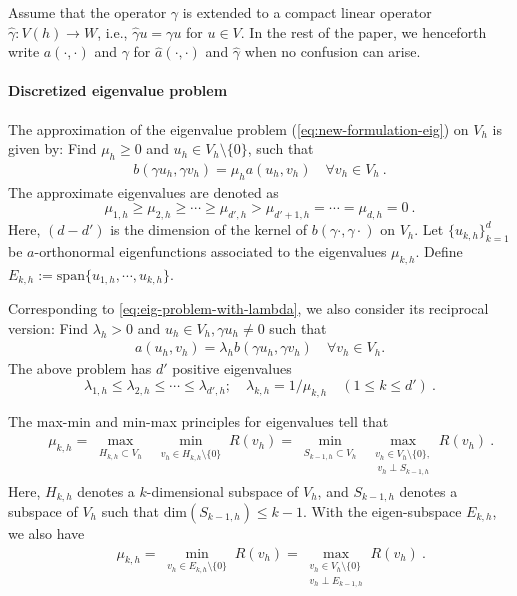 \documentclass[a4,11pt]{article}
\numberwithin{equation}{section}
\begin{document}
Assume that the operator $\gamma$ is extended to a compact linear operator $\widehat{\gamma}:V(h)\to W$, i.e., $\widehat{\gamma} u = \gamma u$  for $u \in V$.
%
In the rest of the paper, 
we henceforth write $a(\cdot, \cdot)$ and $\gamma$ for $\widehat a(\cdot, \cdot)$ and $\widehat\gamma$ when no confusion can arise.
 
 \medskip
 
 
 \paragraph{Discretized eigenvalue problem}
The approximation of the eigenvalue problem (\ref{eq:new-formulation-eig}) on $V_h$ is given by: Find $\mu_{h} \ge 0$ and $u_{h} \in V_{h}\setminus \{0\}$, such that
\begin{eqnarray}
\label{eq:eig-problem-n-m-h}
b(\gamma u_{h}, \gamma v_{h}) = \mu_h a(u_{h}, v_{h})\quad\forall v_{h}\in V_{h}~.
\end{eqnarray}
%
The approximate eigenvalues are denoted as
$$
\mu_{1,h} \ge \mu_{2,h} \ge \cdots \ge \mu_{{d'},h} > \mu_{{d'}+1,h} = \cdots  = 
\mu_{d,h}=0~.
$$
Here, $(d-{d'})$ is the dimension of the kernel of ${b(\gamma \cdot,\gamma \cdot)}$ on $V_h$. 
%
Let $\{u_{k,h}\}_{k=1}^{d}$ be $a$-orthonormal eigenfunctions
associated to the eigenvalues $\mu_{k,h}$.
Define $E_{k,h}:=\mbox{span}\{u_{1,h}, \cdots, u_{k,h}\}$.
 
Corresponding to \cref{eq:eig-problem-with-lambda}, we also consider its reciprocal  version: 
Find $\lambda_{h} > 0 $ and $u_{h} \in V_{h}, \gamma u_h \neq 0$ such that
\begin{eqnarray}
\label{eq:eig-problem-m-n-h}
a(u_{h},v_{h}) = \lambda_h b(\gamma u_{h}, \gamma v_{h})\quad\forall v_{h}\in V_{h}.
\end{eqnarray}
The above problem has ${d'}$ positive eigenvalues 
\begin{equation}
	\label{eq:def-lambda_k_h}
\lambda_{1,h} \le \lambda_{2,h}\le \cdots \le \lambda_{{d'},h}; \quad \lambda_{k,h}=1/\mu_{k,h}\quad (1\le k \le {d'})\:.
\end{equation}


\medskip


\medskip

The max-min and min-max principles for eigenvalues tell that
\begin{eqnarray}
&&    \mu_{k,h}=\max_{\substack{H_{k,h}\subset V_h}} ~\min_{\substack{v_h\in H_{k,h}\setminus \{0\}}}{R}(v_h) 
=\min_{\substack{S_{k-1,h}\subset V_h}} ~\max_{\substack{v_h\in V_h\setminus \{0\}, \\ ~v_h\perp S_{k-1,h}}} {R}(v_h)\:.
\label{eq:min-max-eig-subspace-fem}
\end{eqnarray}
 Here, $H_{k,h}$ denotes a $k$-dimensional subspace of  $V_h$,  and 
  $S_{k-1,h}$ denotes a subspace of  $V_h$ such that $\mbox{dim}(S_{k-1,h}) \le k-1$.  With the eigen-subspace  $E_{k,h}$, we also have
\begin{eqnarray}
&&\mu_{k,h}=\min_{\substack{v_h\in E_{k,h}\setminus \{0\}}} R(v_h) = 
\max_{\substack{v_h\in V_h\setminus\{0\}\\ v_h\perp E_{k-1,h}}} R(v_h) \:.
\label{eq:min-max-eigen-subspace-fem}
\end{eqnarray}
\end{document}
